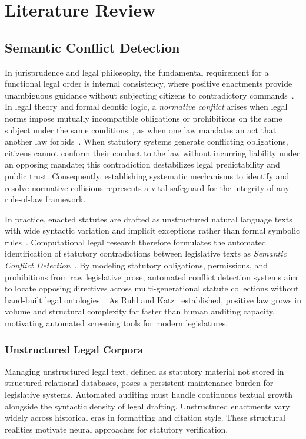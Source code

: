 \chapter{Literature Review}
    
\section{Semantic Conflict Detection}
In jurisprudence and legal philosophy, the fundamental requirement for a functional legal order is internal consistency, where positive enactments provide unambiguous guidance without subjecting citizens to contradictory commands~\cite{fuller1964the}. In legal theory and formal deontic logic, a \textit{normative conflict} arises when legal norms impose mutually incompatible obligations or prohibitions on the same subject under the same conditions~\cite{li2012detecting, agotnes2007on}, as when one law mandates an act that another law forbids~\cite{agotnes2007on, italiani2026clash}. When statutory systems generate conflicting obligations, citizens cannot conform their conduct to the law without incurring liability under an opposing mandate; this contradiction destabilizes legal predictability and public trust. Consequently, establishing systematic mechanisms to identify and resolve normative collisions represents a vital safeguard for the integrity of any rule-of-law framework.

In practice, enacted statutes are drafted as unstructured natural language texts with wide syntactic variation and implicit exceptions rather than formal symbolic rules~\cite{chalkidis2022lexglue}. Computational legal research therefore formulates the automated identification of statutory contradictions between legislative texts as \textit{Semantic Conflict Detection}~\cite{italiani2026clash}. By modeling statutory obligations, permissions, and prohibitions from raw legislative prose, automated conflict detection systems aim to locate opposing directives across multi-generational statute collections without hand-built legal ontologies~\cite{italiani2026clash}. As Ruhl and Katz~\cite{ruhl2015measuring} established, positive law grows in volume and structural complexity far faster than human auditing capacity, motivating automated screening tools for modern legislatures.

   \subsection{Unstructured Legal Corpora}
   Managing unstructured legal text, defined as statutory material not stored in structured relational databases, poses a persistent maintenance burden for legislative systems. Automated auditing must handle continuous textual growth alongside the syntactic density of legal drafting. Unstructured enactments vary widely across historical eras in formatting and citation style. These structural realities motivate neural approaches for statutory verification.
   
